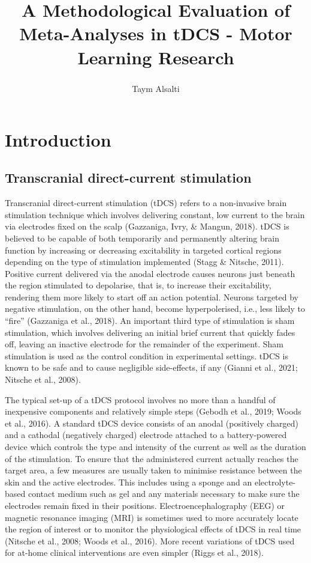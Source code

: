 \documentclass[
  man,floatsintext]{apa6}
\title{A Methodological Evaluation of Meta-Analyses in tDCS - Motor Learning Research}
\author{Taym Alsalti\textsuperscript{}}
\date{}
\affiliation{\vspace{0.5cm}\textsuperscript{} Freie Universität Berlin}
\begin{document}
\maketitle

\hypertarget{introduction}{%
\section{Introduction}\label{introduction}}

\hypertarget{transcranial-direct-current-stimulation}{%
\subsection{Transcranial direct-current stimulation}\label{transcranial-direct-current-stimulation}}

Transcranial direct-current stimulation (tDCS) refers to a non-invasive brain stimulation technique which involves delivering constant, low current to the brain via electrodes fixed on the scalp (Gazzaniga, Ivry, \& Mangun, 2018). tDCS is believed to be capable of both temporarily and permanently altering brain function by increasing or decreasing excitability in targeted cortical regions depending on the type of stimulation implemented (Stagg \& Nitsche, 2011). Positive current delivered via the anodal electrode causes neurons just beneath the region stimulated to depolarise, that is, to increase their excitability, rendering them more likely to start off an action potential. Neurons targeted by negative stimulation, on the other hand, become hyperpolerised, i.e., less likely to ``fire'' (Gazzaniga et al., 2018). An important third type of stimulation is sham stimulation, which involves delivering an initial brief current that quickly fades off, leaving an inactive electrode for the remainder of the experiment. Sham stimulation is used as the control condition in experimental settings. tDCS is known to be safe and to cause negligible side-effects, if any (Gianni et al., 2021; Nitsche et al., 2008).

The typical set-up of a tDCS protocol involves no more than a handful of inexpensive components and relatively simple steps (Gebodh et al., 2019; Woods et al., 2016). A standard tDCS device consists of an anodal (positively charged) and a cathodal (negatively charged) electrode attached to a battery-powered device which controls the type and intensity of the current as well as the duration of the stimulation. To ensure that the administered current actually reaches the target area, a few measures are usually taken to minimise resistance between the skin and the active electrodes. This includes using a sponge and an electrolyte-based contact medium such as gel and any materials necessary to make sure the electrodes remain fixed in their positions. Electroencephalography (EEG) or magnetic resonance imaging (MRI) is sometimes used to more accurately locate the region of interest or to monitor the physiological effects of tDCS in real time (Nitsche et al., 2008; Woods et al., 2016). More recent variations of tDCS used for at-home clinical interventions are even simpler (Riggs et al., 2018).
\vspace{-1mm}
\end{document}
